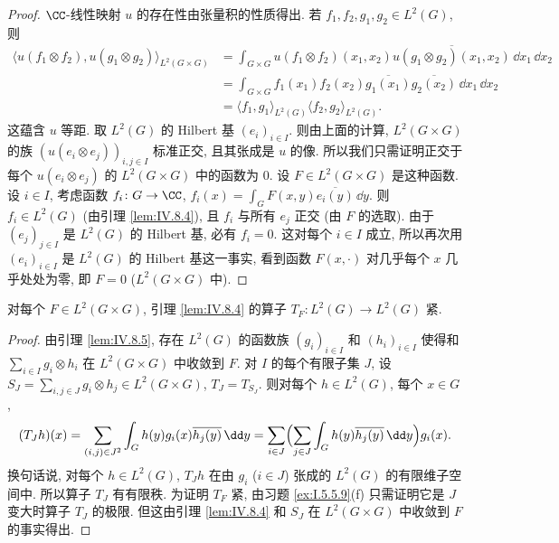 \begin{proof}
$\CC$-线性映射 $u$ 的存在性由张量积的性质得出. 若 $f_1, f_2, g_1, g_2 \in L^2(G)$, 则
\begin{align*}
\langle u(f_1 \otimes f_2), u(g_1 \otimes g_2) \rangle_{L^2(G \times G)} &= \int_{G \times G}u(f_1 \otimes f_2)(x_1, x_2)\overline{u(g_1 \otimes g_2)(x_1, x_2)}\,\dd x_1\,\dd x_2 \\
&= \int_{G \times G}f_1(x_1)f_2(x_2)\overline{g_1(x_1)}\overline{g_2(x_2)}\,\dd x_1\,\dd x_2 \\
&= \langle f_1, g_1 \rangle_{L^2(G)}\langle f_2, g_2 \rangle_{L^2(G)}.
\end{align*}
这蕴含 $u$ 等距.
取 $L^2(G)$ 的 Hilbert 基 $(e_i)_{i \in I}$. 则由上面的计算, $L^2(G \times G)$ 的族 $(u(e_i \otimes e_j))_{i,j \in I}$ 标准正交, 且其张成是 $u$ 的像. 所以我们只需证明正交于每个 $u(e_i \otimes e_j)$ 的 $L^2(G \times G)$ 中的函数为 $0$. 设 $F \in L^2(G \times G)$ 是这种函数. 设 $i \in I$, 考虑函数 $f_i \colon G \to \CC$, $f_i(x) = \int_G F(x, y)\overline{e_i(y)}\,\dd y$. 则 $f_i \in L^2(G)$ (由引理 \ref{lem:IV.8.4}), 且 $f_i$ 与所有 $e_j$ 正交 (由 $F$ 的选取). 由于 $(e_j)_{j \in I}$ 是 $L^2(G)$ 的 Hilbert 基, 必有 $f_i = 0$. 这对每个 $i \in I$ 成立, 所以再次用 $(e_i)_{i \in I}$ 是 $L^2(G)$ 的 Hilbert 基这一事实, 看到函数 $F(x, \cdot)$ 对几乎每个 $x$ 几乎处处为零, 即 $F = 0$ ($L^2(G \times G)$ 中).
\end{proof}

\begin{lemma}[核算子紧]
\label{lem:IV.8.6}
对每个 $F \in L^2(G \times G)$, 引理 \ref{lem:IV.8.4} 的算子 $T_F \colon L^2(G) \to L^2(G)$ 紧.
\end{lemma}

\begin{proof}
由引理 \ref{lem:IV.8.5}, 存在 $L^2(G)$ 的函数族 $(g_i)_{i \in I}$ 和 $(h_i)_{i \in I}$ 使得和 $\sum_{i \in I}g_i \otimes h_i$ 在 $L^2(G \times G)$ 中收敛到 $F$.
对 $I$ 的每个有限子集 $J$, 设 $S_J = \sum_{i,j \in J}g_i \otimes h_j \in L^2(G \times G)$, $T_J = T_{S_J}$. 则对每个 $h \in L^2(G)$, 每个 $x \in G$,
\[
(T_Jh)(x) = \sum_{(i,j) \in J^2}\int_G h(y)g_i(x)\overline{h_j(y)}\,\dd y = \sum_{i \in J}\Bigl(\sum_{j \in J}\int_G h(y)\overline{h_j(y)}\,\dd y\Bigr)g_i(x).
\]
换句话说, 对每个 $h \in L^2(G)$, $T_Jh$ 在由 $g_i$ ($i \in J$) 张成的 $L^2(G)$ 的有限维子空间中. 所以算子 $T_J$ 有有限秩.
为证明 $T_F$ 紧, 由习题 \ref{ex:I.5.5.9}(f) 只需证明它是 $J$ 变大时算子 $T_J$ 的极限. 但这由引理 \ref{lem:IV.8.4} 和 $S_J$ 在 $L^2(G \times G)$ 中收敛到 $F$ 的事实得出.
\end{proof}


